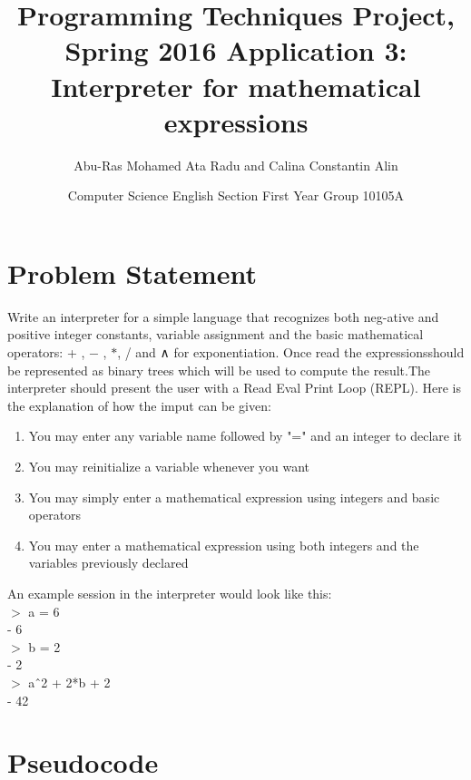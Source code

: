 \documentclass{article}
\begin{document}
	
	
	\title{Programming Techniques Project, Spring 2016 Application 3: Interpreter for mathematical expressions}
	\author{Abu-Ras Mohamed Ata Radu and Calina Constantin Alin }
	\date{Computer Science English Section First Year Group 10105A}
	\maketitle
	\pagebreak
	
\section{Problem Statement}
Write an interpreter for a simple language that recognizes both neg-ative and positive integer constants, variable assignment and the basic mathematical operators: + , $ - $ , $ * $, / and ∧ for exponentiation. Once read the expressionsshould be represented as binary trees which will be used to compute the result.The interpreter should present the user with a Read Eval Print Loop (REPL).
\linebreak
\linebreak
Here is the explanation of how the imput can be given:
\begin{enumerate}
\item  You may enter any variable name followed by "=" and an integer to declare it
\item  You may reinitialize a variable whenever you want 
\item  You may simply enter a mathematical expression using integers and basic operators
\item  You may enter a mathematical expression using both integers and the variables previously declared
\end{enumerate}
An example session in the interpreter would look like this:\\

$>$ a = 6\\

- 6\\

$>$ b = 2\\

- 2\\

$>$ aˆ2 + 2*b + 2\\

- 42\\

\section{Pseudocode}
\end{document}

